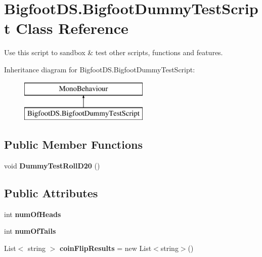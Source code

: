 \hypertarget{class_bigfoot_d_s_1_1_bigfoot_dummy_test_script}{}\section{Bigfoot\+D\+S.\+Bigfoot\+Dummy\+Test\+Script Class Reference}
\label{class_bigfoot_d_s_1_1_bigfoot_dummy_test_script}


Use this script to sandbox \& test other scripts, functions and features.  


Inheritance diagram for Bigfoot\+D\+S.\+Bigfoot\+Dummy\+Test\+Script\+:\begin{figure}[H]
\begin{center}
\leavevmode
\includegraphics[height=2.000000cm]{class_bigfoot_d_s_1_1_bigfoot_dummy_test_script}
\end{center}
\end{figure}
\subsection*{Public Member Functions}
\begin{DoxyCompactItemize}
\item 
\mbox{\label{class_bigfoot_d_s_1_1_bigfoot_dummy_test_script_a5e6dae54403c8d2f9f2828d6215d7b43}} 
void {\bfseries Dummy\+Test\+Roll\+D20} ()
\end{DoxyCompactItemize}
\subsection*{Public Attributes}
\begin{DoxyCompactItemize}
\item 
\mbox{\label{class_bigfoot_d_s_1_1_bigfoot_dummy_test_script_adef9fade3a144affcd34352ebeb40920}} 
int {\bfseries num\+Of\+Heads}
\item 
\mbox{\label{class_bigfoot_d_s_1_1_bigfoot_dummy_test_script_a69c07d16341795395f15f8d368fbb805}} 
int {\bfseries num\+Of\+Tails}
\item 
\mbox{\label{class_bigfoot_d_s_1_1_bigfoot_dummy_test_script_a339ee60fc8f620a967362e4659453e78}} 
List$<$ string $>$ {\bfseries coin\+Flip\+Results} = new List$<$string$>$()
\end{DoxyCompactItemize}


